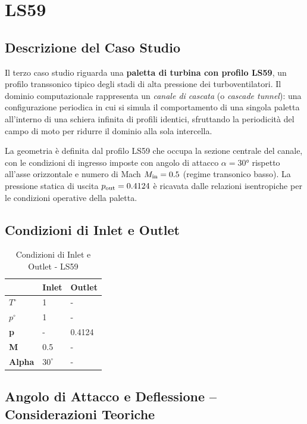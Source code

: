 \chapter{LS59}
\label{cap:progetto3}

\section{Descrizione del Caso Studio}
\label{sec:paletta_descrizione}

Il terzo caso studio riguarda una \textbf{paletta di turbina con profilo LS59}, un profilo
transsonico tipico degli stadi di alta pressione dei turboventilatori. Il dominio
computazionale rappresenta un \emph{canale di cascata} (o \emph{cascade tunnel}): una
configurazione periodica in cui si simula il comportamento di una singola paletta
all'interno di una schiera infinita di profili identici, sfruttando la periodicità del
campo di moto per ridurre il dominio alla sola intercella.

La geometria è definita dal profilo LS59 che occupa la sezione centrale del canale, con
le condizioni di ingresso imposte con angolo di attacco $\alpha = 30°$ rispetto all'asse
orizzontale e numero di Mach $M_{\rm in} = 0.5$ (regime transonico basso). La pressione
statica di uscita $p_{\rm out} = 0.4124$ è ricavata dalle relazioni isentropiche per le
condizioni operative della paletta.

\section{Condizioni di Inlet e Outlet}

\begin{table}[h!]
\centering
\begin{tabular}{|l|l|l|}
\hline
 & \textbf{Inlet} & \textbf{Outlet} \\ \hline
\textbf{$T^\circ$} & 1 & - \\ \hline
\textbf{$p^\circ$} & 1 & - \\ \hline
\textbf{p} & - & 0.4124 \\ \hline
\textbf{M} & 0.5 & - \\ \hline
\textbf{Alpha} & $30^\circ$ & - \\ \hline
\end{tabular}
\caption{Condizioni di Inlet e Outlet - LS59}
\label{tab:ls59_conditions}
\end{table}

\section{Angolo di Attacco e Deflessione -- Considerazioni Teoriche}
\label{sec:paletta_angoli}

